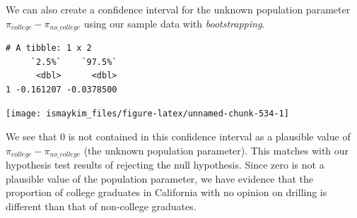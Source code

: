 \documentclass[12pt, krantz2,]{krantz}
\makeatletter
\newenvironment{Shaded}{\begin{snugshade}}{\end{snugshade}}
\newcommand{\DataTypeTok}[1]{\textcolor[rgb]{0.27,0.27,0.27}{#1}}
\newcommand{\DecValTok}[1]{\textcolor[rgb]{0.06,0.06,0.06}{#1}}
\newcommand{\KeywordTok}[1]{\textcolor[rgb]{0.27,0.27,0.27}{\textbf{#1}}}
\newcommand{\NormalTok}[1]{#1}
\newcommand{\OperatorTok}[1]{\textcolor[rgb]{0.43,0.43,0.43}{\textbf{#1}}}
\newcommand{\StringTok}[1]{\textcolor[rgb]{0.5,0.5,0.5}{#1}}
\newenvironment{kframe}{%
\medskip{}
\setlength{\fboxsep}{.8em}
 \def\at@end@of@kframe{}%
 \ifinner\ifhmode%
  \def\at@end@of@kframe{\end{minipage}}%
  \begin{minipage}{\columnwidth}%
 \fi\fi%
 \def\FrameCommand##1{\hskip\@totalleftmargin \hskip-\fboxsep
 \colorbox{shadecolor}{##1}\hskip-\fboxsep
     \hskip-\linewidth \hskip-\@totalleftmargin \hskip\columnwidth}%
 \MakeFramed {\advance\hsize-\width
   \@totalleftmargin\z@ \linewidth\hsize
   \@setminipage}}%
 {\par\unskip\endMakeFramed%
 \at@end@of@kframe}
\renewenvironment{Shaded}{\begin{kframe}}{\end{kframe}}
\makeatother
\begin{document}
We can also create a confidence interval for the unknown population parameter \(\pi_{college} - \pi_{no\_college}\) using our sample data with \emph{bootstrapping}.

\begin{Shaded}
\end{Shaded}

\begin{Shaded}
\end{Shaded}

\begin{verbatim}
# A tibble: 1 x 2
     `2.5%`    `97.5%`
      <dbl>      <dbl>
1 -0.161207 -0.0378500
\end{verbatim}

\begin{Shaded}
\end{Shaded}

\begin{center}\texttt{[image: ismaykim\_files/figure-latex/unnamed-chunk-534-1]} \end{center}

We see that 0 is not contained in this confidence interval as a plausible value of \(\pi_{college} - \pi_{no\_college}\) (the unknown population parameter). This matches with our hypothesis test results of rejecting the null hypothesis. Since zero is not a plausible value of the population parameter, we have evidence that the proportion of college graduates in California with no opinion on drilling is different than that of non-college graduates.
\end{document}
